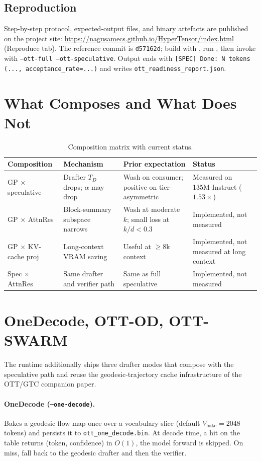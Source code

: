 \documentclass[11pt]{article}
\begin{document}
\subsection{Reproduction}
Step-by-step protocol, expected-output files, and binary artefacts are
published on the project site:
\url{https://nagusamecs.github.io/HyperTensor/index.html} (Reproduce tab).
The reference commit is \texttt{d57162d}; build with
, run , then invoke
 with \texttt{--ott-full --ott-speculative}.
Output ends with \texttt{[SPEC] Done: N tokens (..., acceptance\_rate=...)}
and writes \texttt{ott\_readiness\_report.json}.

\section{What Composes and What Does Not}
\label{sec:compose}
\begin{table}[h]\centering\small
\caption{Composition matrix with current status.}
\begin{tabularx}{\textwidth}{@{}lXXl@{}}
\toprule
Composition & Mechanism & Prior expectation & Status \\
\midrule
GP $\times$ speculative   & Drafter $T_D$ drops; $\alpha$ may drop & Wash on consumer; positive on tier-asymmetric & Measured on 135M-Instruct ($1.53\times$) \\
GP $\times$ AttnRes       & Block-summary subspace narrows & Wash at moderate $k$; small loss at $k/d{<}0.3$ & Implemented, not measured \\
GP $\times$ KV-cache proj & Long-context VRAM saving & Useful at $\geq 8$k context & Implemented, not measured at long context \\
Spec $\times$ AttnRes     & Same drafter and verifier path & Same as full speculative & Implemented, not measured \\
\bottomrule
\end{tabularx}
\end{table}

\section{OneDecode, OTT-OD, OTT-SWARM}
\label{sec:ottmodes}
The runtime additionally ships three drafter modes that compose with the
speculative path and reuse the geodesic-trajectory cache infrastructure
of the OTT/GTC companion paper.

\paragraph{OneDecode (\texttt{--one-decode}).}  Bakes a geodesic flow
map once over a vocabulary slice (default $V_\text{bake}{=}2048$
tokens) and persists it to \texttt{ott\_one\_decode.bin}.  At decode
time, a hit on the table returns (token, confidence) in $O(1)$, the
model forward is skipped.  On miss, fall back to the geodesic drafter
and then the verifier.
\end{document}

